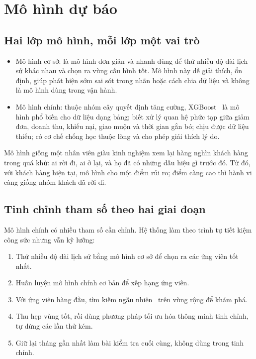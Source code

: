 \section{Mô hình dự báo}

\subsection{Hai lớp mô hình, mỗi lớp một vai trò}

\begin{itemize}
  \item Mô hình cơ sở: là mô hình đơn giản và nhanh dùng để thử nhiều độ dài lịch sử khác nhau và chọn ra vùng cấu hình tốt. Mô hình này dễ giải thích, ổn định, giúp phát hiện sớm sai sót trong nhãn hoặc cách chia dữ liệu và không là mô hình dùng trong vận hành.
  \item Mô hình chính: thuộc nhóm cây quyết định tăng cường, XGBoost~\cite{chen2016xgboost,xgboostdocs} là mô hình phổ biến cho dữ liệu dạng bảng; biết xử lý quan hệ phức tạp giữa giảm đơn, doanh thu, khiếu nại, giao muộn và thời gian gắn bó; chịu được dữ liệu thiếu; có cơ chế chống học thuộc lòng và cho phép giải thích lý do.
\end{itemize}

\begin{hieunhanh}
Mô hình giống một nhân viên giàu kinh nghiệm xem lại hàng nghìn khách hàng trong quá khứ: ai rời đi, ai ở lại, và họ đã có những dấu hiệu gì
trước đó. Từ đó, với khách hàng hiện tại, mô hình cho một điểm rủi ro; điểm càng cao thì hành vi càng giống nhóm khách đã rời đi.
\end{hieunhanh}

\subsection{Tinh chỉnh tham số theo hai giai đoạn}

Mô hình chính có nhiều tham số cần chỉnh. Hệ thống làm theo trình tự tiết kiệm công sức nhưng vẫn kỹ lưỡng:

\begin{enumerate}
  \item Thử nhiều độ dài lịch sử bằng mô hình cơ sở để chọn ra các ứng viên tốt nhất.
  \item Huấn luyện mô hình chính cơ bản để xếp hạng ứng viên.
  \item Với ứng viên hàng đầu, tìm kiếm ngẫu nhiên~\cite{bergstra2012random} trên vùng rộng để khám phá.
  \item Thu hẹp vùng tốt, rồi dùng phương pháp tối ưu hóa thông minh tinh chỉnh, tự dừng các lần thử kém.
  \item Giữ lại tháng gần nhất làm bài kiểm tra cuối cùng, không dùng trong tinh chỉnh.
\end{enumerate}


